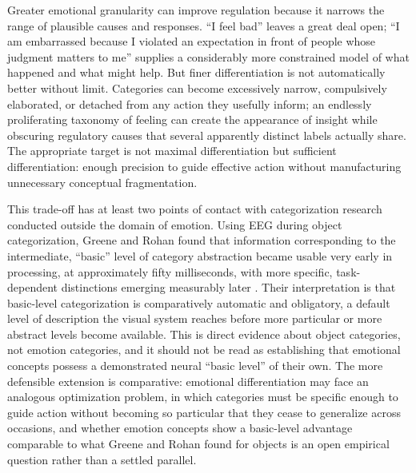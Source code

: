 \documentclass[11pt]{article}
\begin{document}
Greater emotional granularity can improve regulation because it narrows the range of plausible causes and responses. ``I feel bad'' leaves a great deal open; ``I am embarrassed because I violated an expectation in front of people whose judgment matters to me'' supplies a considerably more constrained model of what happened and what might help. But finer differentiation is not automatically better without limit. Categories can become excessively narrow, compulsively elaborated, or detached from any action they usefully inform; an endlessly proliferating taxonomy of feeling can create the appearance of insight while obscuring regulatory causes that several apparently distinct labels actually share. The appropriate target is not maximal differentiation but sufficient differentiation: enough precision to guide effective action without manufacturing unnecessary conceptual fragmentation.

This trade-off has at least two points of contact with categorization research conducted outside the domain of emotion. Using EEG during object categorization, Greene and Rohan found that information corresponding to the intermediate, ``basic'' level of category abstraction became usable very early in processing, at approximately fifty milliseconds, with more specific, task-dependent distinctions emerging measurably later \citep{GreeneRohan2025}. Their interpretation is that basic-level categorization is comparatively automatic and obligatory, a default level of description the visual system reaches before more particular or more abstract levels become available. This is direct evidence about object categories, not emotion categories, and it should not be read as establishing that emotional concepts possess a demonstrated neural ``basic level'' of their own. The more defensible extension is comparative: emotional differentiation may face an analogous optimization problem, in which categories must be specific enough to guide action without becoming so particular that they cease to generalize across occasions, and whether emotion concepts show a basic-level advantage comparable to what Greene and Rohan found for objects is an open empirical question rather than a settled parallel.
\end{document}
